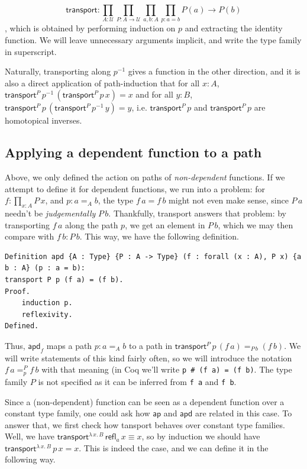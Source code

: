 \documentclass[12 pt]{amsart}
\theoremstyle{definition}
\theoremstyle{remark}
\newcommand{\Type}{\mathcal{U}}
\newcommand{\trans}{\mathsf{transport}}
\newcommand{\ap}{\mathsf{ap}}
\newcommand{\apd}{\mathsf{apd}}
\newcommand{\refl}{\mathsf{refl}}
\begin{document}
\begin{equation}
\trans : \prod_{A : \Type}\prod_{P : A \to \Type}\prod_{a, b : A} \prod_{p : a = b} P(a) \to P(b)
\end{equation}
, which is obtained by performing induction on $p$ and extracting the identity function. We will leave unnecessary arguments implicit, and write the type family in superscript.

Naturally, transporting along $p^{-1}$ gives a function in the other direction, and it is also a direct application of path-induction that for all $x : A$, $\trans^P\, p^{-1} \, (\trans^P\,p\, x) = x$ and for all $y : B$, $\trans^P\, p \, (\trans^P\,p^{-1}\, y) = y$, i.e. $\trans^P\, p$ and $\trans^P\, p$ are homotopical inverses.

\subsection{Applying a dependent function to a path}

Above, we only defined the action on paths of \textit{non-dependent} functions. If we attempt to define it for dependent functions, we run into a problem: for $f : \prod_{x : A} P\, x$, and $p : a =_A b$, the type $f\,a = f\, b$ might not even make sense, since $P\,a$ needn't be \textit{judgementally} $P\, b$. Thankfully, transport answers that problem: by transporting $f\,a$ along the path $p$, we get an element in $P\,b$, which we may then compare with $f\, b : P\, b$. This way, we have the following definition.

\begin{lstlisting}
Definition apd {A : Type} {P : A -> Type} (f : forall (x : A), P x) {a b : A} (p : a = b): 
transport P p (f a) = (f b).
Proof.
    induction p.
    reflexivity.
Defined.
\end{lstlisting}

Thus, $\apd_f$ maps a path $p : a =_A b$ to a path in $\trans^P \, p \,(f\,a) =_{P\,b} (f\,b)$. We will write statements of this kind fairly often, so we will introduce the notation $f\,a =^P_p f\,b$ with that meaning (in Coq we'll write \texttt{p \# (f a) = (f b)}. The type family $P$ is not specified as it can be inferred from \texttt{f a} and \texttt{f b}.

Since a (non-dependent) function can be seen as a dependent function over a constant type family, one could ask how $\ap$ and $\apd$ are related in this case. To answer that, we first check how tansport behaves over constant type families. Well, we have $\trans^{\lambda \,x.\, B}\,\refl_{a}\, x \equiv x$, so by induction we should have $\trans^{\lambda \,x.\, B}\,p \, x = x$. This is indeed the case, and we can define it in the following way.
\end{document}

